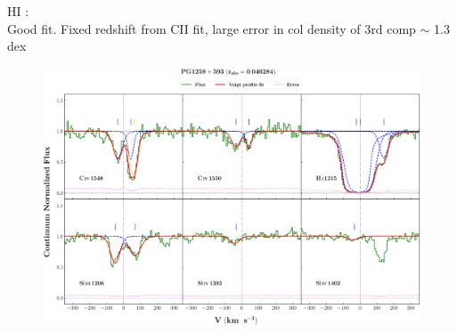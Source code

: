 \documentclass[12pt]{report}
\begin{document}
HI :  \\  \hspace*{1.5cm}
        Good fit. Fixed redshift from CII fit, large error in col density of 3rd comp  $\sim$  1.3 dex \\



\newpage

\begin{landscape}

\begin{figure}
    \centering
    \vspace{-20mm}
    \hspace*{-35mm}
    \includegraphics[width=1.25\linewidth]{System-Plots/PG1259+593_z=0.046284_sys_plot.png}
\end{figure}

\end{landscape}
\end{document}
